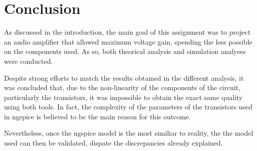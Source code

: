 \pagebreak
\section{Conclusion}
\label{con}

\par As discussed in the introduction, the main goal of this assignment was to project an audio amplifier that allowed maximum voltage gain, spending the less possible on the components used. As so, both theorical analysis and simulation analyses were conducted. 

\par Despite strong efforts to match the results obtained in the different analysis, it was concluded that, due to the non-linearity of the components of the circuit, particularly the transistors, it was impossible to obtain the exact same quality using both tools. In fact, the complexity of the parameters of the transistors used in ngspice is believed to be the main reason for this outcome.

\par Nevertheless, once the ngspice model is the most similiar to reality, the the model used can then be validated, dispate the discrepancies already explained.

